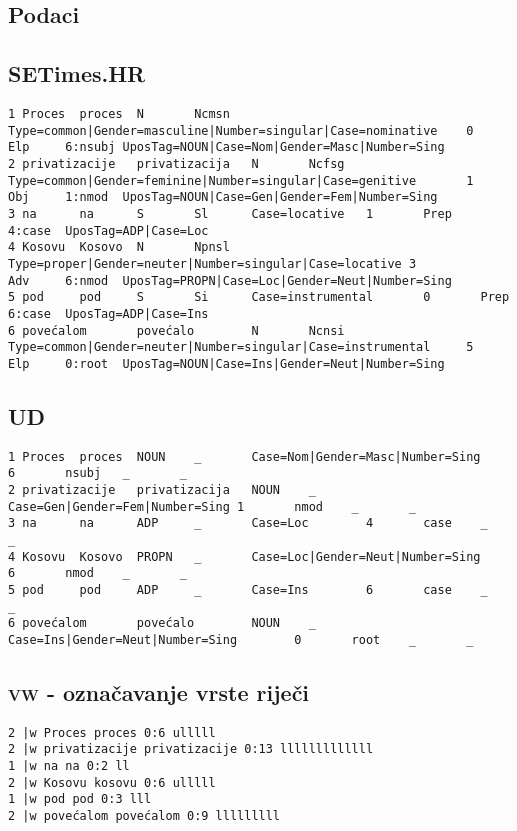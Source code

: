\begin{appendix}
\chapter{Podaci}\label{appendix:data}
\section{SETimes.HR}
\begin{lstlisting}[basicstyle=\tiny\ttfamily]
1 Proces  proces  N       Ncmsn   Type=common|Gender=masculine|Number=singular|Case=nominative    0
Elp     6:nsubj UposTag=NOUN|Case=Nom|Gender=Masc|Number=Sing
2 privatizacije   privatizacija   N       Ncfsg   Type=common|Gender=feminine|Number=singular|Case=genitive       1
Obj     1:nmod  UposTag=NOUN|Case=Gen|Gender=Fem|Number=Sing
3 na      na      S       Sl      Case=locative   1       Prep    4:case  UposTag=ADP|Case=Loc
4 Kosovu  Kosovo  N       Npnsl   Type=proper|Gender=neuter|Number=singular|Case=locative 3
Adv     6:nmod  UposTag=PROPN|Case=Loc|Gender=Neut|Number=Sing
5 pod     pod     S       Si      Case=instrumental       0       Prep    6:case  UposTag=ADP|Case=Ins
6 povećalom       povećalo        N       Ncnsi   Type=common|Gender=neuter|Number=singular|Case=instrumental     5
Elp     0:root  UposTag=NOUN|Case=Ins|Gender=Neut|Number=Sing
\end{lstlisting}

\section{UD}
\begin{lstlisting}[basicstyle=\tiny\ttfamily]
1 Proces  proces  NOUN    _       Case=Nom|Gender=Masc|Number=Sing        6       nsubj   _       _
2 privatizacije   privatizacija   NOUN    _       Case=Gen|Gender=Fem|Number=Sing 1       nmod    _       _
3 na      na      ADP     _       Case=Loc        4       case    _       _
4 Kosovu  Kosovo  PROPN   _       Case=Loc|Gender=Neut|Number=Sing        6       nmod    _       _
5 pod     pod     ADP     _       Case=Ins        6       case    _       _
6 povećalom       povećalo        NOUN    _       Case=Ins|Gender=Neut|Number=Sing        0       root    _       _
\end{lstlisting}

\section{\textsc{vw} - označavanje vrste riječi}
\begin{lstlisting}[basicstyle=\tiny\ttfamily]
2 |w Proces proces 0:6 ulllll
2 |w privatizacije privatizacije 0:13 lllllllllllll
1 |w na na 0:2 ll
2 |w Kosovu kosovu 0:6 ulllll
1 |w pod pod 0:3 lll
2 |w povećalom povećalom 0:9 lllllllll
\end{lstlisting}

\end{appendix}
